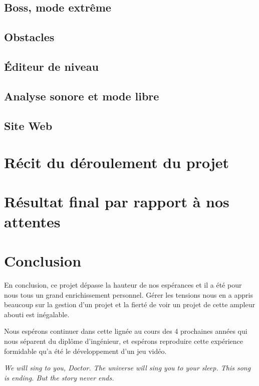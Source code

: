 \documentclass[12pt,a4paper]{article}
\begin{document}
		\subsection{Boss, mode extrême}
			
		\subsection{Obstacles}
			
		\subsection{Éditeur de niveau}
			
		\subsection{Analyse sonore et mode libre}
			
		\subsection{Site Web}
			
	
	\section{Récit du déroulement du projet}
			
			
	\section{Résultat final par rapport à nos attentes}
		
	
	\section{Conclusion}
		\par En conclusion, ce projet dépasse la hauteur de nos espérances et il a été pour nous tous un grand enrichissement personnel. Gérer les tensions nous en a appris beaucoup sur la gestion d'un projet et la fierté de voir un projet de cette ampleur abouti est inégalable.
		\par Nous espérons continuer dans cette lignée au cours des 4 prochaines années qui nous séparent du diplôme d'ingénieur, et espérons reproduire cette expérience formidable qu'a été le développement d'un jeu vidéo.
		\vspace{2cm}		
		\par \emph{We will sing to you, Doctor. The universe will sing you to your sleep. This song is ending. But the story never ends.}
\end{document}
